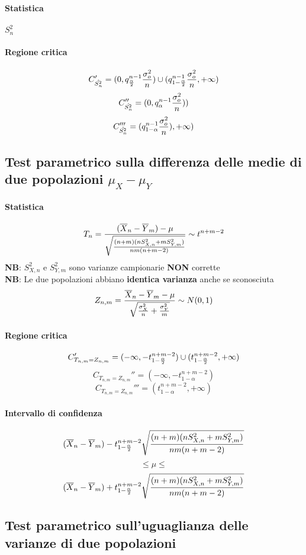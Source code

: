 \documentclass[12pt]{article}
\begin{document}
    \paragraph{Statistica} $S_n^2$
    \paragraph{Regione critica}
    $$C_{\hat{S_n^2}}' = (0, q_{\alpha \over 2}^{n-1}{\sigma_o^2 \over {n}}) \cup (q_{1-{\alpha \over 2}}^{n-1}{\sigma_o^2 \over {n}}, +\infty)$$
    $$C_{\hat{S_n^2}}'' = (0, q_\alpha^{n-1}{\sigma_o^2 \over {n}}))$$
    $$C_{\hat{S_n^2}}''' = (q_{1-\alpha}^{n-1}{\sigma_o^2 \over {n}}), +\infty)$$
    \newpage
    \subsection{Test parametrico sulla differenza delle medie di due popolazioni $\mu_X - \mu_Y$}
    \paragraph{Statistica} 
    $$T_n = {{(\overline{X}_n - \overline{Y}_m) - \mu} \over \sqrt{{(n+m)(nS_{X,n}^2+mS_{Y,m}^2)}\over{nm(n+m-2)}}} \sim t^{n+m-2}$$
    \textbf{NB}: $S^2_{X,n}$ e $S^2_{Y,m}$ sono varianze campionarie \textbf{NON} corrette
    \\\textbf{NB}: Le due popolazioni abbiano \textbf{identica varianza} anche se sconosciuta
    $$Z_{n,m} = {{\overline{X}_n - \overline{Y}_m - \mu}\over \sqrt{{\sigma_X^2 \over n}+{\sigma_Y^2 \over m}}} \sim N(0,1)$$
    \paragraph{Regione critica}
    $$C_{T_{n,m} = Z_{n, m}}' = (-\infty, -t^{n+m-2}_{1-{\alpha \over 2}}) \cup (t^{n+m-2}_{1-{\alpha \over 2}}, +\infty)$$
    $$C_{T_{n,m} = Z_{n, m}}'' = (-\infty, -t^{n+m-2}_{1-\alpha})$$
    $$C_{T_{n,m} = Z_{n, m}}''' = (t^{n+m-2}_{1-\alpha}, +\infty)$$
    \paragraph{Intervallo di confidenza}
    $$(\overline{X}_n - \overline{Y}_m) -t^{n+m-2}_{1-{\alpha \over 2}}\sqrt{{(n+m)(nS_{X,n}^2+mS_{Y,m}^2)}\over{nm(n+m-2)}}$$
    $$\leq \mu \leq$$ 
    $$ (\overline{X}_n - \overline{Y}_m) + t^{n+m-2}_{1-{\alpha \over 2}}\sqrt{{(n+m)(nS_{X,n}^2+mS_{Y,m}^2)}\over{nm(n+m-2)}}$$
    \newpage
    \subsection{Test parametrico sull'uguaglianza delle varianze di due popolazioni}
\end{document}
